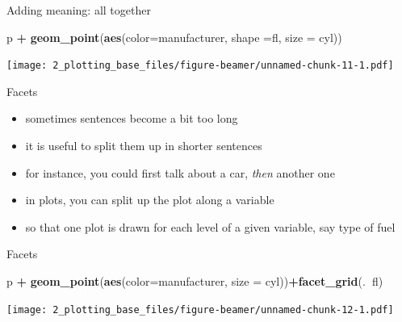 \documentclass[
  ignorenonframetext,
]{beamer}
\newenvironment{Shaded}{\begin{snugshade}}{\end{snugshade}}
\newcommand{\DataTypeTok}[1]{\textcolor[rgb]{0.13,0.29,0.53}{#1}}
\newcommand{\KeywordTok}[1]{\textcolor[rgb]{0.13,0.29,0.53}{\textbf{#1}}}
\newcommand{\NormalTok}[1]{#1}
\newcommand{\OperatorTok}[1]{\textcolor[rgb]{0.81,0.36,0.00}{\textbf{#1}}}
\newcommand{\StringTok}[1]{\textcolor[rgb]{0.31,0.60,0.02}{#1}}
\providecommand{\tightlist}{%
  \setlength{\itemsep}{0pt}\setlength{\parskip}{0pt}}
\begin{document}
\begin{frame}[fragile]{Adding meaning: all together}
\protect\hypertarget{adding-meaning-all-together}{}

\begin{Shaded}
\begin{Highlighting}[]
\NormalTok{p }\OperatorTok{+}\StringTok{ }\KeywordTok{geom_point}\NormalTok{(}\KeywordTok{aes}\NormalTok{(}\DataTypeTok{color=}\NormalTok{manufacturer, }\DataTypeTok{shape =}\NormalTok{fl, }\DataTypeTok{size =}\NormalTok{ cyl))}
\end{Highlighting}
\end{Shaded}

\texttt{[image: 2\_plotting\_base\_files/figure-beamer/unnamed-chunk-11-1.pdf]}

\end{frame}

\begin{frame}{Facets}
\protect\hypertarget{facets}{}

\begin{itemize}
\tightlist
\item
  sometimes sentences become a bit too long
\item
  it is useful to split them up in shorter sentences
\item
  for instance, you could first talk about a car, \emph{then} another
  one
\item
  in plots, you can split up the plot along a variable
\item
  so that one plot is drawn for each level of a given variable, say type
  of fuel
\end{itemize}

\end{frame}

\begin{frame}[fragile]{Facets}
\protect\hypertarget{facets-1}{}

\begin{Shaded}
\begin{Highlighting}[]
\NormalTok{p }\OperatorTok{+}\StringTok{ }\KeywordTok{geom_point}\NormalTok{(}\KeywordTok{aes}\NormalTok{(}\DataTypeTok{color=}\NormalTok{manufacturer, }\DataTypeTok{size =}\NormalTok{ cyl))}\OperatorTok{+}\KeywordTok{facet_grid}\NormalTok{(.}\OperatorTok{~}\NormalTok{fl)}
\end{Highlighting}
\end{Shaded}

\texttt{[image: 2\_plotting\_base\_files/figure-beamer/unnamed-chunk-12-1.pdf]}

\end{frame}
\end{document}
